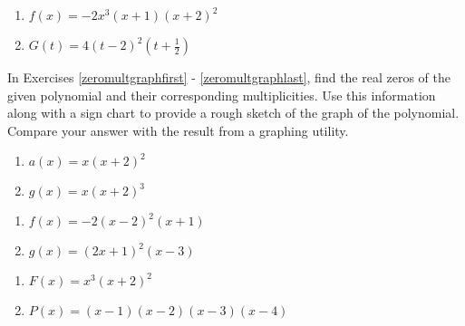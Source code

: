 \begin{multicols}{2}
\begin{enumerate}
\setcounter{enumi}{\value{HW}}

\item $f(x) = -2x^3(x+1)(x+2)^2$
\item $G(t) = 4(t-2)^2\left(t+\frac{1}{2}\right)$ \label{polyfactslast}

\setcounter{HW}{\value{enumi}}
\end{enumerate}
\end{multicols}

\label{polygraphexercise}

In Exercises \ref{zeromultgraphfirst} - \ref{zeromultgraphlast}, find the real zeros of the given polynomial and their corresponding multiplicities.  Use this information along with a sign chart to provide a rough sketch of the graph of the polynomial.  Compare your answer with the result from a graphing utility.

\begin{multicols}{2}
\begin{enumerate}
\setcounter{enumi}{\value{HW}}

\item $a(x) = x(x + 2)^{2}$ \label{zeromultgraphfirst}
\item $g(x) = x(x + 2)^{3}$

\setcounter{HW}{\value{enumi}}
\end{enumerate}
\end{multicols}


\begin{multicols}{2}
\begin{enumerate}
\setcounter{enumi}{\value{HW}}

\item $f(x) = -2(x-2)^2(x+1)$
\item $g(x) = (2x+1)^2(x-3)$

\setcounter{HW}{\value{enumi}}
\end{enumerate}
\end{multicols}


\begin{multicols}{2}
\begin{enumerate}
\setcounter{enumi}{\value{HW}}

\item $F(x) = x^{3}(x + 2)^{2}$
\item $P(x) = (x - 1)(x - 2)(x - 3)(x - 4)$

\setcounter{HW}{\value{enumi}}
\end{enumerate}
\end{multicols}


